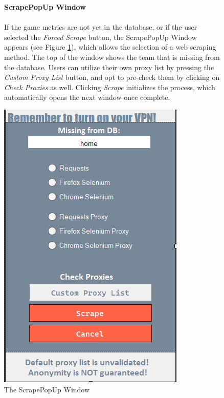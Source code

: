 \documentclass{thesis-ekf}
\theoremstyle{definition}
\theoremstyle{remark}
\begin{document}
\begin{figure}[h]
	\begin{minipage}{0.6\textwidth}
		\textbf{ScrapePopUp Window} \\ \\
		If the game metrics are not yet in the database, or if the user selected the \emph{Forced Scrape} button, the ScrapePopUp Window appears (see Figure \ref{img-scrapepopup}), which allows the selection of a web scraping method. The top of the window shows the team that is missing from the database. Users can utilize their own proxy list by pressing the \emph{Custom Proxy List} button, and opt to pre-check them by clicking on \emph{Check Proxies} as well. Clicking \emph{Scrape} initializes the process, which automatically opens the next window once complete.
	\end{minipage}
	\hfill
	\begin{minipage}{0.27\textwidth}
		\centering
		\includegraphics[width=\textwidth]{img/user-guide/ScrapePopUp} 
		\caption{The ScrapePopUp Window}
		\label{img-scrapepopup}
	\end{minipage}
\end{figure}
\end{document}
